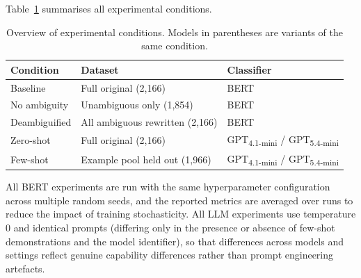 Table~\ref{tab:experiment_overview} summarises all experimental conditions.

\begin{table}[h]
\centering
\caption{Overview of experimental conditions. Models in parentheses are variants of the same condition.}
\label{tab:experiment_overview}
\begin{tabular}{lll}
\toprule
Condition & Dataset & Classifier \\
\midrule
Baseline      & Full original (2,166)          & BERT \\
No ambiguity  & Unambiguous only (1,854)       & BERT \\
Deambiguified & All ambiguous rewritten (2,166) & BERT \\
\midrule
Zero-shot     & Full original (2,166)          & GPT\textsubscript{4.1-mini} / GPT\textsubscript{5.4-mini} \\
Few-shot      & Example pool held out (1,966)  & GPT\textsubscript{4.1-mini} / GPT\textsubscript{5.4-mini} \\
\bottomrule
\end{tabular}
\end{table}

All BERT experiments are run with the same hyperparameter configuration across multiple random seeds, and the reported metrics are averaged over runs to reduce the impact of training stochasticity. All LLM experiments use temperature 0 and identical prompts (differing only in the presence or absence of few-shot demonstrations and the model identifier), so that differences across models and settings reflect genuine capability differences rather than prompt engineering artefacts.
